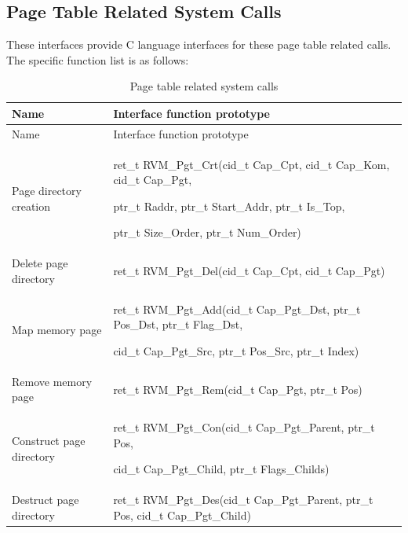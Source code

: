 \subsection{Page Table Related System Calls}\label{subsec:3-5-3}

These interfaces provide C language interfaces for these page table related calls. The specific function list is as follows:

\begin{xltabular}{\textwidth}{@{}>{\hsize\raggedright\arraybackslash}X>{\hsize\raggedright\arraybackslash}X@{}}
\caption{Page table related system calls}\label{tab:3-7}\\
\toprule
Name & Interface function prototype\tabularnewline
\endfirsthead
\toprule
Name & Interface function prototype\tabularnewline
\midrule
\endhead
\bottomrule
\endlastfoot
Page directory creation\strut
 & ret\_\allowbreak{}t RVM\_\allowbreak{}Pgt\_\allowbreak{}Crt(cid\_\allowbreak{}t Cap\_\allowbreak{}Cpt, cid\_\allowbreak{}t Cap\_\allowbreak{}Kom, cid\_\allowbreak{}t Cap\_\allowbreak{}Pgt,

ptr\_\allowbreak{}t Raddr, ptr\_\allowbreak{}t Start\_\allowbreak{}Addr, ptr\_\allowbreak{}t Is\_\allowbreak{}Top,

ptr\_\allowbreak{}t Size\_\allowbreak{}Order, ptr\_\allowbreak{}t Num\_\allowbreak{}Order)\strut
\tabularnewline
Delete page directory & ret\_\allowbreak{}t RVM\_\allowbreak{}Pgt\_\allowbreak{}Del(cid\_\allowbreak{}t Cap\_\allowbreak{}Cpt, cid\_\allowbreak{}t
Cap\_\allowbreak{}Pgt)\tabularnewline
Map memory page\strut
 & ret\_\allowbreak{}t RVM\_\allowbreak{}Pgt\_\allowbreak{}Add(cid\_\allowbreak{}t Cap\_\allowbreak{}Pgt\_\allowbreak{}Dst, ptr\_\allowbreak{}t Pos\_\allowbreak{}Dst, ptr\_\allowbreak{}t
Flag\_\allowbreak{}Dst,

cid\_\allowbreak{}t Cap\_\allowbreak{}Pgt\_\allowbreak{}Src, ptr\_\allowbreak{}t Pos\_\allowbreak{}Src, ptr\_\allowbreak{}t Index)\strut
\tabularnewline
Remove memory page & ret\_\allowbreak{}t RVM\_\allowbreak{}Pgt\_\allowbreak{}Rem(cid\_\allowbreak{}t Cap\_\allowbreak{}Pgt, ptr\_\allowbreak{}t
Pos)\tabularnewline
Construct page directory\strut
 & ret\_\allowbreak{}t RVM\_\allowbreak{}Pgt\_\allowbreak{}Con(cid\_\allowbreak{}t Cap\_\allowbreak{}Pgt\_\allowbreak{}Parent, ptr\_\allowbreak{}t Pos,

cid\_\allowbreak{}t Cap\_\allowbreak{}Pgt\_\allowbreak{}Child, ptr\_\allowbreak{}t Flags\_\allowbreak{}Childs)\strut
\tabularnewline
Destruct page directory & ret\_\allowbreak{}t RVM\_\allowbreak{}Pgt\_\allowbreak{}Des(cid\_\allowbreak{}t Cap\_\allowbreak{}Pgt\_\allowbreak{}Parent, ptr\_\allowbreak{}t Pos,
cid\_\allowbreak{}t Cap\_\allowbreak{}Pgt\_\allowbreak{}Child)\tabularnewline
\end{xltabular}

